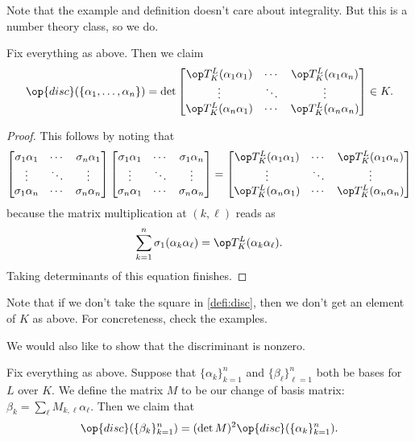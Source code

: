 Note that the example and definition doesn't care about integrality. But this is a number theory class, so we do.
\begin{prop}
    Fix everything as above. Then we claim
    \[\op{disc}(\{\alpha_1,\ldots,\alpha_n\})=\det\begin{bmatrix}
        \op T_K^L(\alpha_1\alpha_1) & \cdots & \op T_K^L(\alpha_1\alpha_n) \\
        \vdots & \ddots & \vdots \\
        \op T_K^L(\alpha_n\alpha_1) & \cdots & \op T_K^L(\alpha_n\alpha_n)
    \end{bmatrix}\in K.\]
\end{prop}
\begin{proof}
    This follows by noting that
    \[\begin{bmatrix}
        \sigma_1\alpha_1 & \cdots & \sigma_n\alpha_1 \\
        \vdots & \ddots & \vdots \\
        \sigma_1\alpha_n & \cdots & \sigma_n\alpha_n
    \end{bmatrix}
    \begin{bmatrix}
        \sigma_1\alpha_1 & \cdots & \sigma_1\alpha_n \\
        \vdots & \ddots & \vdots \\
        \sigma_n\alpha_1 & \cdots & \sigma_n\alpha_n
    \end{bmatrix}=\begin{bmatrix}
        \op T_K^L(\alpha_1\alpha_1) & \cdots & \op T_K^L(\alpha_1\alpha_n) \\
        \vdots & \ddots & \vdots \\
        \op T_K^L(\alpha_n\alpha_1) & \cdots & \op T_K^L(\alpha_n\alpha_n)
    \end{bmatrix}\]
    because the matrix multiplication at $(k,\ell)$ reads as
    \[\sum_{k=1}^n\sigma_1(\alpha_k\alpha_\ell)=\op T_K^L(\alpha_k\alpha_\ell).\]
    Taking determinants of this equation finishes.
\end{proof}
\begin{remark}
    Note that if we don't take the square in \autoref{defi:disc}, then we don't get an element of $K$ as above. For concreteness, check the examples.
\end{remark}
We would also like to show that the discriminant is nonzero.
\begin{lem} \label{lem:lem0}
    Fix everything as above. Suppose that $\{\alpha_k\}_{k=1}^n$ and $\{\beta_\ell\}_{\ell=1}^n$ both be bases for $L$ over $K.$ We define the matrix $M$ to be our change of basis matrix: $\beta_k=\sum_\ell M_{k,\ell}\alpha_\ell.$ Then we claim that
    \[\op{disc}(\{\beta_k\}_{k=1}^n)=(\det M)^2\op{disc}(\{\alpha_k\}_{k=1}^n).\]
\end{lem}
